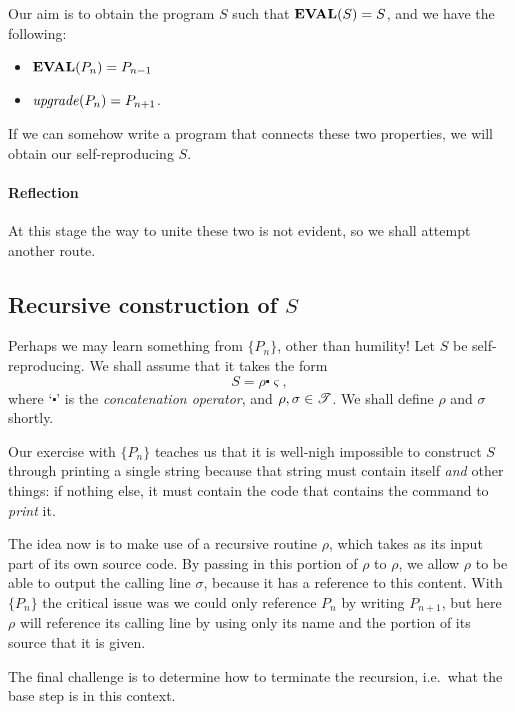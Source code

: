 Our aim is to obtain the program $S$ such that $\text{\bf EVAL}(S)=S$, and we have the following:
\begin{itemize}
    \item $\text{\bf EVAL}(P_n) = P_{n-1}$
    \item $\text{\textit{upgrade}}(P_n) = P_{n+1}$.
\end{itemize}
If we can somehow write a program that connects these two properties, we will obtain our
self-reproducing $S$.

\paragraph{Reflection} At this stage the way to unite these two is not evident, so we shall attempt
another route.

\subsection{Recursive construction of $S$}
Perhaps we may learn something from $\{P_n\}$, other than humility! 
Let $S$ be self-reproducing. We shall assume that it takes the form
\begin{equation}\label{recdef}
S = \rho\centerdot{}\varsigma,
\end{equation}
where `$\centerdot$' is the {\sl concatenation operator}, and $\rho,\sigma\in\mathscr{T}$.
We shall define $\rho$ and $\sigma$ shortly.

Our exercise with $\{P_n\}$ teaches us that it is well-nigh impossible to construct $S$ through
printing a single string because that string must contain itself \textit{and} other things: if
nothing else, it must contain the code that contains the command to \textit{print} it.

The idea now is to make use of a recursive routine $\rho$, which takes as its input part of its own
source code. By passing in this portion of $\rho$ to $\rho$, we allow $\rho$ to be able to output
the calling line $\sigma$, because it has a reference to this content. With $\{P_n\}$ the critical
issue was we could only reference $P_n$ by writing $P_{n+1}$, but here $\rho$ will reference its
calling line by using only its name and the portion of its source that it is given.

The final challenge is to determine how to terminate the recursion, i.e.\ what the base step is in
this context.
